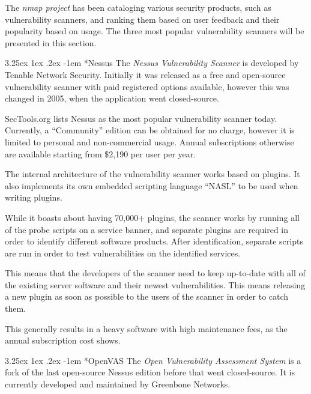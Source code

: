 \documentclass[a4paper,12pt]{article}
\makeatletter
\renewcommand\paragraph{\@startsection{paragraph}{6}{\parindent}%
  {3.25ex \@plus1ex \@minus .2ex}%
  {-1em}%
  {\normalfont\normalsize\bfseries}}
\makeatother
\begin{document}
	The \textit{nmap project} has been cataloging various security products, such as vulnerability scanners, and ranking them based on user feedback and their popularity based on usage\cite{sectools}. The three most popular vulnerability scanners will be presented in this section.
	
	\paragraph*{Nessus} The \textit{Nessus Vulnerability Scanner}\cite{nessus} is developed by Tenable Network Security. Initially it was released as a free and open-source vulnerability scanner with paid registered options available, however this was changed in 2005, when the application went closed-source.
	
	SecTools.org lists Nessus as the most popular vulnerability scanner today. Currently, a ``Community'' edition can be obtained for no charge, however it is limited to personal and non-commercial usage. Annual subscriptions otherwise are available starting from \$2,190 per user per year.
	
	The internal architecture of the vulnerability scanner works based on plugins. It also implements its own embedded scripting language ``NASL'' to be used when writing plugins.
	
	While it boasts about having 70,000+ plugins, the scanner works by running all of the probe scripts on a service banner, and separate plugins are required in order to identify different software products. After identification, separate scripts are run in order to test vulnerabilities on the identified services.
	
	This means that the developers of the scanner need to keep up-to-date with all of the existing server software and their newest vulnerabilities. This means releasing a new plugin as soon as possible to the users of the scanner in order to catch them.
	
	This generally results in a heavy software with high maintenance fees, as the annual subscription cost shows.
	
	\paragraph*{OpenVAS} The \textit{Open Vulnerability Assessment System}\cite{openvas} is a fork of the last open-source Nessus edition before that went closed-source. It is currently developed and maintained by Greenbone Networks.
	
\end{document}
